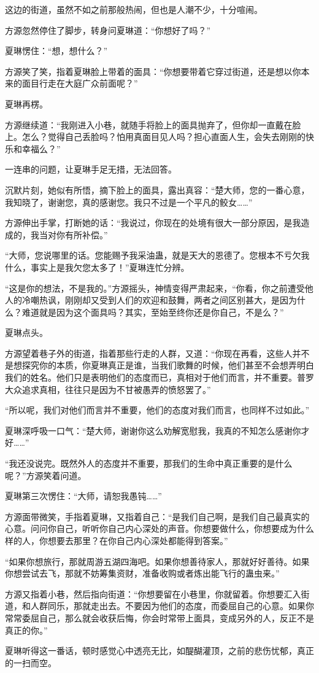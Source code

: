 \begin{this_body}
这边的街道，虽然不如之前那般热闹，但也是人潮不少，十分喧闹。

方源忽然停住了脚步，转身问夏琳道：“你想好了吗？”

夏琳愣住：“想，想什么？”

方源笑了笑，指着夏琳脸上带着的面具：“你想要带着它穿过街道，还是想以你本来的面目行走在大庭广众前面呢？”

夏琳再楞。

方源继续道：“我刚进入小巷，就随手将脸上的面具抛弃了，但你却一直戴在脸上。怎么？觉得自己丢脸吗？怕用真面目见人吗？担心直面人生，会失去刚刚的快乐和幸福么？”

一连串的问题，让夏琳手足无措，无法回答。

沉默片刻，她似有所悟，摘下脸上的面具，露出真容：“楚大师，您的一番心意，我知晓了，谢谢您，真的感谢您。我只不过是一个平凡的鲛女……”

方源伸出手掌，打断她的话：“我说过，你现在的处境有很大一部分原因，是我造成的，我当对你有所补偿。”

“大师，您说哪里的话。您能赐予我采油蛊，就是天大的恩德了。您根本不亏欠我什么，事实上是我欠您太多了！”夏琳连忙分辨。

“这是你的想法，不是我的。”方源摇头，神情变得严肃起来，“你看，你之前遭受他人的冷嘲热讽，刚刚却又受到人们的欢迎和鼓舞，两者之间区别甚大，是因为什么？难道就是因为这个面具吗？其实，至始至终你还是你自己，不是么？”

夏琳点头。

方源望着巷子外的街道，指着那些行走的人群，又道：“你现在再看，这些人并不是想探究你的本质，你夏琳真正是谁，当我们歌舞的时候，他们甚至不会想弄明白我们的姓名。他们只是表明他们的态度而已，真相对于他们而言，并不重要。普罗大众追求真相，往往只是因为不甘被愚弄的愤怒罢了。”

“所以呢，我们对他们而言并不重要，他们的态度对我们而言，也同样不过如此。”

夏琳深呼吸一口气：“楚大师，谢谢你这么劝解宽慰我，我真的不知怎么感谢你才好……”

“我还没说完。既然外人的态度并不重要，那我们的生命中真正重要的是什么呢？”方源笑着问道。

夏琳第三次愣住：“大师，请恕我愚钝……”

方源面带微笑，手指着夏琳，又指着自己：“是我们自己啊，是我们自己最真实的心意。问问你自己，听听你自己内心深处的声音。你想要做什么，你想要成为什么样的人，你想要去那里？在你自己内心深处都能得到答案。”

“如果你想旅行，那就周游五湖四海吧。如果你想善待家人，那就好好善待。如果你想尝试去飞，那就不妨筹集资财，准备收购或者炼出能飞行的蛊虫来。”

方源又指着小巷，然后指向街道：“你想要留在小巷里，你就留着。你想要汇入街道，和人群同乐，那就走出去。不要因为他们的态度，而委屈自己的心意。如果你常常委屈自己，那么就会收获后悔，你会时常带上面具，变成另外的人，反正不是真正的你。”

夏琳听得这一番话，顿时感觉心中透亮无比，如醍醐灌顶，之前的悲伤忧郁，真正的一扫而空。

\end{this_body}

